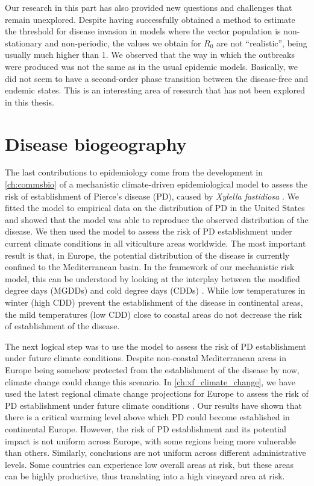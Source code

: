 Our research in this part has also provided new questions and challenges that
remain unexplored. Despite having successfully obtained a method to estimate
the threshold for disease invasion in models where the vector population is
non-stationary and non-periodic, the values we obtain for $R_0$ are not
``realistic'', being usually much higher than 1. We observed that the way in
which the outbreaks were produced was not the same as in the usual epidemic
models. Basically, we did not seem to have a second-order phase transition
between the disease-free and endemic states. This is an interesting area of
research that has not been explored in this thesis.

\section{Disease biogeography}

The last contributions to epidemiology come from the development in
\cref{ch:commsbio} of a mechanistic climate-driven epidemiological model to
assess the risk of establishment of Pierce's disease (PD), caused by
\textit{Xylella fastidiosa} \cite{GimenezRomero2022_CommsBio}. We fitted the
model to empirical data on the distribution of PD in the United States and
showed that the model was able to reproduce the observed distribution of the
disease. We then used the model to assess the risk of PD establishment under
current climate conditions in all viticulture areas worldwide. The most
important result is that, in Europe, the potential distribution of the disease
is currently confined to the Mediterranean basin. In the framework of our
mechanistic risk model, this can be understood by looking at the interplay
between the modified degree days (MGDDs) and cold degree days (CDDs)
\cite{GimenezRomero2022_CommsBio}. While low temperatures in winter (high CDD)
prevent the establishment of the disease in continental areas, the mild
temperatures (low CDD) close to coastal areas do not decrease the risk of
establishment of the disease.

The next logical step was to use the model to assess the risk of PD
establishment under future climate conditions. Despite non-coastal
Mediterranean areas in Europe being somehow protected from the establishment of
the disease by now, climate change could change this scenario. In
\cref{ch:xf_climate_change}, we have used the latest regional climate change
projections for Europe to assess the risk of PD establishment under future
climate conditions \cite{GimenezRomero2023_PD}.
Our results have shown that there is a critical warming level above which PD
could become established in continental Europe. However, the risk of PD
establishment and its potential impact is not uniform across Europe, with some
regions being more vulnerable than others. Similarly, conclusions are not
uniform across different administrative levels. Some countries can experience
low overall areas at risk, but these areas can be highly productive, thus
translating into a high vineyard area at risk.

